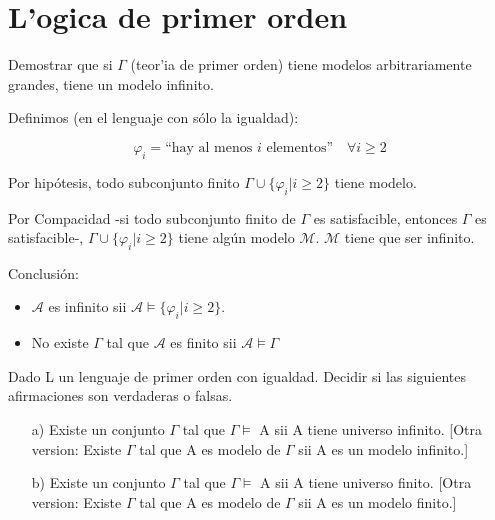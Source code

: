 \section{L'ogica de primer orden} 
\begin{questions}

\question Demostrar que si $\Gamma$ (teor'ia de primer orden) tiene modelos arbitrariamente grandes, tiene un modelo infinito. 


\begin{solution}
 Definimos (en el lenguaje con s\'olo la igualdad): 
 
 \begin{equation*}
  \varphi_i = \text{``hay al menos $i$ elementos''} \quad \forall i \geq 2
 \end{equation*}

 Por hip\'otesis, todo subconjunto finito $\Gamma\cup\{\varphi_i | i\geq2\}$ tiene modelo. 
 
 Por Compacidad -si todo subconjunto finito de $\Gamma$ es satisfacible, entonces $\Gamma$ es satisfacible-, $\Gamma\cup\{\varphi_i | i \geq 2\}$ tiene alg\'un modelo $\mathcal{M}$. $\mathcal{M}$ tiene que ser infinito. 
 
 Conclusi\'on: 
 
 \begin{itemize}
  \item $\mathcal{A}$ es infinito sii $\mathcal{A} \vDash \{\varphi_i | i \geq 2\}$. 
  \item No existe $\Gamma$ tal que $\mathcal{A}$ es finito sii $\mathcal{A}\vDash\Gamma$
 \end{itemize}

\end{solution}

\question Dado L un lenguaje de primer orden con igualdad. Decidir si las siguientes afirmaciones son verdaderas o falsas. 

\begin{enumerate}
  \item[a)] Existe un conjunto $\Gamma$ tal que $\Gamma \models$ A sii A tiene universo infinito. [Otra version: Existe $\Gamma$ tal que A es modelo de $\Gamma$ sii A es un modelo infinito.]
  
  \item[b)] Existe un conjunto $\Gamma$ tal que $\Gamma \models$ A sii A tiene universo finito. [Otra version: Existe $\Gamma$ tal que A es modelo de $\Gamma$ sii A es un modelo finito.]
  

\end{enumerate}
\end{questions}
